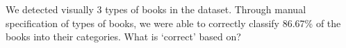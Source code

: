 \documentclass{article}\usepackage[]{graphicx}\usepackage[]{color}
\newcommand{\hh}[1]{{\color{magenta} #1}}
\begin{document}
We detected visually 3 types of books in the dataset. Through manual specification of types of books, we were able to correctly classify 86.67\% of the books into their categories. \hh{What is `correct' based on?}
\end{document}
